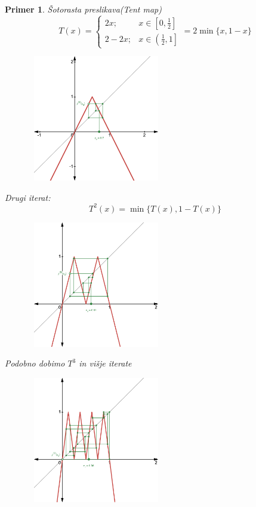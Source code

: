\documentclass{article}
\newtheorem{primer}{Primer}
\begin{document}
\begin{primer}
Šotorasta preslikava(Tent map)
$$
T(x)= \begin{cases}2 x ; & x \in\left[0, \frac{1}{2}\right] \\ 2-2 x ; & x \in\left(\frac{1}{2}, 1\right]\end{cases} =2\min\{x, 1 - x\} 
$$
\begin{figure}[h!]
    \begin{center}
        \includegraphics[width=6cm, height=5.5cm]{Grafi/cobweb8.png}
    \end{center}
\end{figure}   

Drugi iterat: 
$$T^2(x) = \min\{T(x), 1 - T(x)\}$$

\begin{figure}[h!]
    \begin{center}
        \includegraphics[width=6cm, height=5.5cm]{Grafi/cobweb9.png}
    \end{center}
\end{figure} 
\newpage
Podobno dobimo $T^3$ in višje iterate 

\begin{figure}[h!]
    \begin{center}
        \includegraphics[width=6cm, height=5.5cm]{Grafi/cobweb10.png}
    \end{center}
\end{figure} 



\end{primer}
\end{document}
